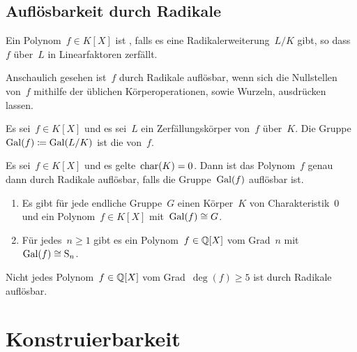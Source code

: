 \subsection{Auflösbarkeit durch Radikale}

\begin{definition}
  Ein Polynom~$f \in K[X]$ ist , falls es eine Radikalerweiterung~$L/K$ gibt, so dass~$f$ über~$L$ in Linearfaktoren zerfällt. 
\end{definition}

Anschaulich gesehen ist~$f$ durch Radikale auflösbar, wenn sich die Nullstellen von~$f$ mithilfe der üblichen Körperoperationen, sowie Wurzeln, ausdrücken lassen. 

\begin{definition}
  Es sei~$f \in K[X]$ und es sei~$L$ ein Zerfällungskörper von~$f$ über~$K$.
  Die Gruppe~$\operatorname{Gal}(f) \coloneqq \operatorname{Gal}(L/K)$ ist die  von~$f$.
\end{definition}

\begin{theorem}
  Es sei~$f \in K[X]$ und es gelte~$\operatorname{char}(K) = 0$.
  Dann ist das Polynom~$f$ genau dann durch Radikale auflösbar, falls die Gruppe~$\operatorname{Gal}(f)$ auflösbar ist.
\end{theorem}

\begin{lemma}
  \leavevmode
  \begin{enumerate}
    \item
      Es gibt für jede endliche Gruppe~$G$ einen Körper~$K$ von Charakteristik~$0$ und ein Polynom~$f \in K[X]$ mit~$\operatorname{Gal}(f) \cong G$.
    \item
      Für jedes~$n \geq 1$ gibt es ein Polynom~$f \in \mathbb{Q}[X]$ vom Grad~$n$ mit~$\operatorname{Gal}(f) \cong \operatorname{S}_n$.
  \end{enumerate}
\end{lemma}

\begin{theorem}
  Nicht jedes Polynom~$f \in \mathbb{Q}[X]$ vom Grad~$\deg(f) \geq 5$ ist durch Radikale auflösbar.
\end{theorem}





\section{Konstruierbarkeit}



